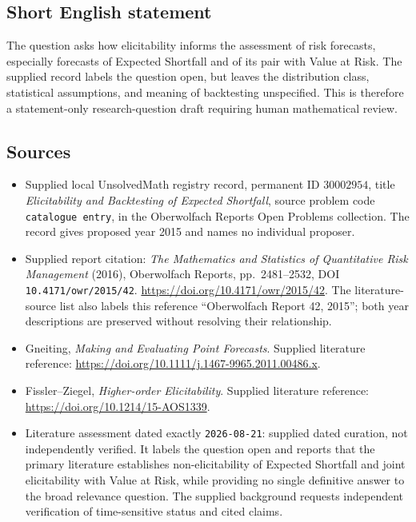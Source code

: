 \documentclass[11pt]{article}
\begin{document}
\subsection{Short English statement}
The question asks how elicitability informs the assessment of risk forecasts, especially forecasts of Expected Shortfall and of its pair with Value at Risk. The supplied record labels the question open, but leaves the distribution class, statistical assumptions, and meaning of backtesting unspecified. This is therefore a statement-only research-question draft requiring human mathematical review.
\subsection{Sources}
\begin{itemize}
\item Supplied local UnsolvedMath registry record, permanent ID \(30002954\), title \emph{Elicitability and Backtesting of Expected Shortfall}, source problem code \texttt{catalogue entry}, in the Oberwolfach Reports Open Problems collection. The record gives proposed year 2015 and names no individual proposer.
\item Supplied report citation: \emph{The Mathematics and Statistics of Quantitative Risk Management} (2016), Oberwolfach Reports, pp.\ 2481--2532, DOI \texttt{10.4171/owr/2015/42}. \url{https://doi.org/10.4171/owr/2015/42}. The literature-source list also labels this reference ``Oberwolfach Report 42, 2015''; both year descriptions are preserved without resolving their relationship.
\item Gneiting, \emph{Making and Evaluating Point Forecasts}. Supplied literature reference: \url{https://doi.org/10.1111/j.1467-9965.2011.00486.x}.
\item Fissler--Ziegel, \emph{Higher-order Elicitability}. Supplied literature reference: \url{https://doi.org/10.1214/15-AOS1339}.
\item Literature assessment dated exactly \texttt{2026-08-21}: supplied dated curation, not independently verified. It labels the question open and reports that the primary literature establishes non-elicitability of Expected Shortfall and joint elicitability with Value at Risk, while providing no single definitive answer to the broad relevance question. The supplied background requests independent verification of time-sensitive status and cited claims.
\end{itemize}
\end{document}
